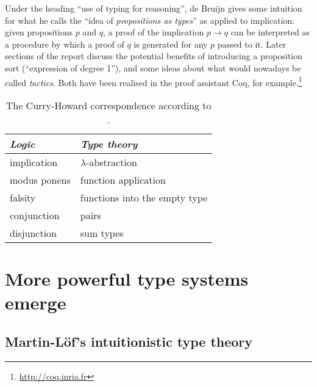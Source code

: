 \documentclass[12pt,toc=bibliography,numbers=noendperiod,
               footnotes=multiple,twoside]{scrartcl}
\begin{document}
Under the heading \enquote{use of typing for reasoning}, de Bruijn gives some intuition for what he calls the \enquote{idea of \emph{propositions as types}} as applied to implication: given propositions \(p\) and \(q\), a proof of the implication \(p \rightarrow q\) can be interpreted as a procedure by which a proof of \(q\) is generated for any \(p\) passed to it. Later sections of the report discuss the potential benefits of introducing a proposition sort (\enquote{expression of degree 1}), and some ideas about what would nowadays be called \emph{tactics}. Both have been realised in the proof assistant Coq, for example.\footnote{\url{http://coq.inria.fr}}

\begin{table}[h]
    \centering
    \begin{tabular}{l l}
        \toprule
        \textit{Logic} & \textit{Type theory} \\
        \midrule
	implication & \(\lambda\)-abstraction \\
	modus ponens & function application \\
	falsity & functions into the empty type \\
	conjunction & pairs \\
	disjunction & sum types \\
        \bottomrule
    \end{tabular}
    \caption{The Curry-Howard correspondence according to \textcite{howard_formulae-as-types_1980}.}
    \label{tab:howard}
\end{table}


\section{More powerful type systems emerge}

\subsection{Martin-Löf's intuitionistic type theory}
\end{document}
